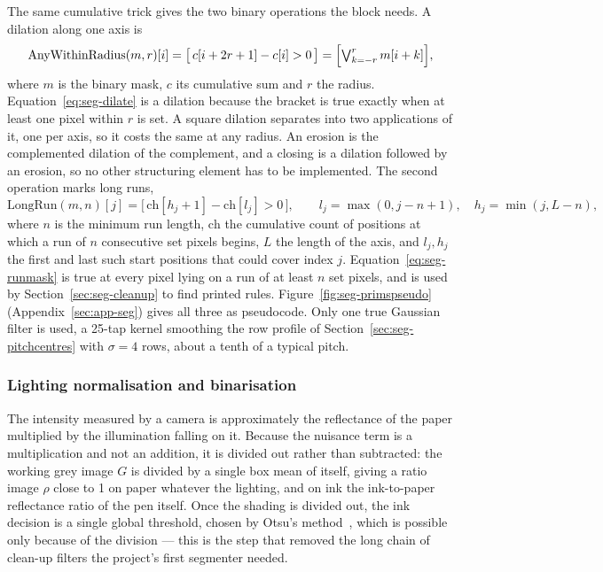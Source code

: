 The same cumulative trick gives the two binary operations the block needs. A dilation along one axis is
\begin{equation}
\mathrm{AnyWithinRadius}(m,r)[i]=\bigl[\,c[i+2r+1]-c[i]>0\,\bigr]=\Bigl[\textstyle\bigvee_{k=-r}^{r} m[i+k]\Bigr],
\label{eq:seg-dilate}
\end{equation}
where $m$ is the binary mask, $c$ its cumulative sum and $r$ the radius. Equation~\ref{eq:seg-dilate} is a dilation because the bracket is true exactly when at least one pixel within $r$ is set. A square dilation separates into two applications of it, one per axis, so it costs the same at any radius. An erosion is the complemented dilation of the complement, and a closing is a dilation followed by an erosion, so no other structuring element has to be implemented. The second operation marks long runs,
\begin{equation}
\mathrm{LongRun}(m,n)[j]=\bigl[\,\mathrm{ch}[h_j+1]-\mathrm{ch}[l_j]>0\,\bigr],\qquad l_j=\max(0,j-n+1),\quad h_j=\min(j,L-n),
\label{eq:seg-runmask}
\end{equation}
where $n$ is the minimum run length, $\mathrm{ch}$ the cumulative count of positions at which a run of $n$ consecutive set pixels begins, $L$ the length of the axis, and $l_j,h_j$ the first and last such start positions that could cover index $j$. Equation~\ref{eq:seg-runmask} is true at every pixel lying on a run of at least $n$ set pixels, and is used by Section~\ref{sec:seg-cleanup} to find printed rules. Figure~\ref{fig:seg-primspseudo} (Appendix~\ref{sec:app-seg}) gives all three as pseudocode. Only one true Gaussian filter is used, a 25-tap kernel smoothing the row profile of Section~\ref{sec:seg-pitchcentres} with $\sigma=4$ rows, about a tenth of a typical pitch.

\subsubsection{Lighting normalisation and binarisation}

The intensity measured by a camera is approximately the reflectance of the paper multiplied by the illumination falling on it. Because the nuisance term is a multiplication and not an addition, it is divided out rather than subtracted: the working grey image $G$ is divided by a single box mean of itself, giving a ratio image $\rho$ close to 1 on paper whatever the lighting, and on ink the ink-to-paper reflectance ratio of the pen itself. Once the shading is divided out, the ink decision is a single global threshold, chosen by Otsu's method~\cite[p.~63]{otsu1979}, which is possible only because of the division --- this is the step that removed the long chain of clean-up filters the project's first segmenter needed.

